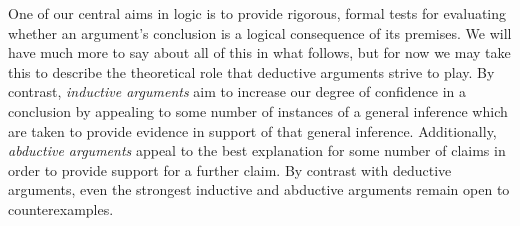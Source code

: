 %
%

One of our central aims in logic is to provide rigorous, formal tests for evaluating whether an argument's conclusion is a logical consequence of its premises.
We will have much more to say about all of this in what follows, but for now we may take this to describe the theoretical role that deductive arguments strive to play.
By contrast, \textit{inductive arguments} aim to increase our degree of confidence in a conclusion by appealing to some number of instances of a general inference which are taken to provide evidence in support of that general inference.
Additionally, \textit{abductive arguments} appeal to the best explanation for some number of claims in order to provide support for a further claim. 
By contrast with deductive arguments, even the strongest inductive and abductive arguments remain open to counterexamples.

